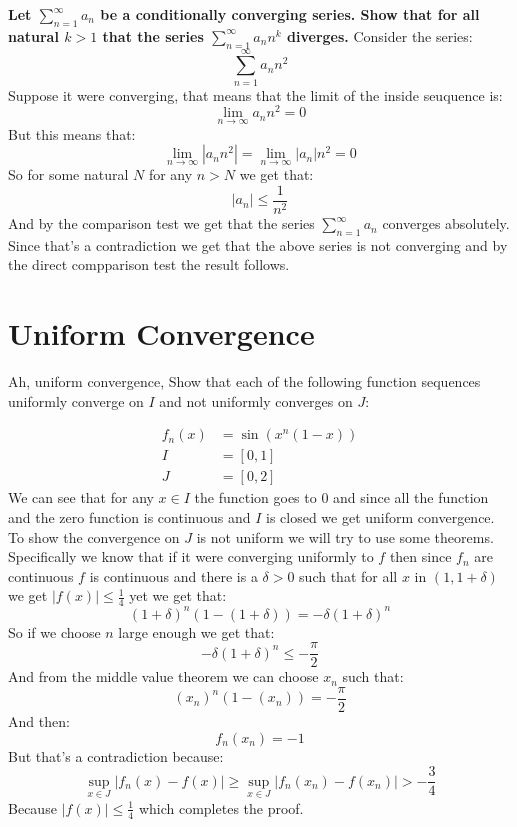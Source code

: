 \documentclass{article}
\theoremstyle{plain}
\begin{document}
	\textbf{Let $\sum_{n=1}^{\infty}{a_n}$ be a conditionally converging
	series. Show that for all natural $k>1$ that the series 
	$\sum_{n=1}^{\infty}{a_{n}n^{k}}$ diverges.}
	Consider the series:
	\[
		\sum_{n=1}^{\infty}{a_{n}n^2}
	\]
	Suppose it were converging, that means that the limit of the inside
	seuquence is:
	\[
		\lim_{n\to\infty}{a_{n}n^2} = 0
	\]
	But this means that:
	\[
		\lim_{n\to\infty}{|a_{n}n^2|} = \lim_{n\to\infty}{|a_{n}|n^2} = 0
	\]
	So for some natural $N$ for any $n > N$ we get that:
	\[
		|a_n| \le \frac{1}{n^2}
	\]
	And by the comparison test we get that the series 
	$\sum_{n=1}^{\infty}{a_n}$ converges absolutely. Since that's
	a contradiction we get that the above series is not converging
	and by the direct compparison test the result follows.
	
	\newpage
	
	\section{Uniform Convergence}
	Ah, uniform convergence, 
	Show that each of the following function sequences uniformly converge on
	$I$ and not uniformly converges on $J$:
	
	\begin{align*}
		f_n(x) &= \sin(x^n(1-x)) \\
		I &= [0,1] \\
		J &= [0,2]
	\end{align*}
	We can see that for any $x\in I$ the function goes to $0$ and since
	all the function and the zero function is continuous and $I$ is closed
	we get uniform convergence. To show the convergence on $J$ is not
	uniform we will try to use some theorems. Specifically we know that
	if it were converging uniformly to $f$ then since $f_n$ are continuous
	$f$ is continuous and there is a $\delta > 0$ such that for all $x$ in
	$(1,1+\delta)$ we get $|f(x)| \le \frac 14$ yet we get that:
	\[
		(1+\delta)^n(1-(1+\delta)) = -\delta(1+\delta)^n
	\]
	So if we choose $n$ large enough we get that:
	\[
		-\delta(1+\delta)^n \le -\frac{\pi}{2}
	\]
	And from the middle value theorem we can choose $x_n$ such that:
	\[
		(x_n)^n(1-(x_n)) = -\frac{\pi}{2}
	\]
	And then:
	\[
		f_n(x_n) = -1
	\]
	But that's a contradiction because:
	\[
		\sup_{x\in J}|f_n(x) - f(x)| \geq 
		\sup_{x\in J}|f_n(x_n) - f(x_n)| > -\frac 34
	\]
	Because $|f(x)| \le \frac 14$ which completes the proof.
	
	\newpage
	
\end{document}
